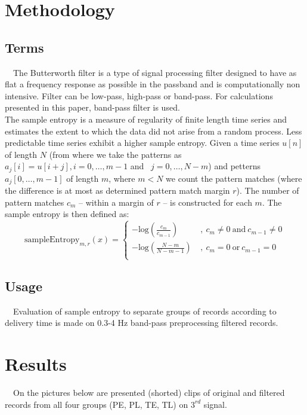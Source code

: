 \documentclass[a4paper,11pt]{article}
\begin{document}
\section{Methodology}

\subsection{Terms}
\ \
The Butterworth filter is a type of signal processing filter designed to have as flat a frequency response as possible in the passband and is computationally non intensive.
Filter can be low-pass, high-pass or band-pass. For calculations presented in this paper, band-pass filter is used.
\\
The sample entropy is a measure of regularity of finite length time series and estimates the extent to which the data did not arise from a random process.
Less predictable time series exhibit a higher sample entropy. 
Given a time series $u[n]$ of length $N$ (from where we take the patterns as $a_j[i] = u[i + j], i = 0, \ldots, m - 1$ and  $j = 0, \ldots, N - m$) and petterns $a_j[0, \ldots, m - 1]$ of length $m$, where $m < N$ we count the pattern matches (where the difference is at most as determined pattern match margin $r$).
The number of pattern matches $c_m$ -- within a margin of $r$ -- is constructed for each $m$.
The sample entropy is then defined as:
\begin{displaymath}
    \text{sampleEntropy}_{m, r}(x) = \left\{ \begin{array}{ll}
     - \text{log} \left( \frac{c_m}{c_{m-1}} \right) & \ , \ c_m \neq 0 \ \text{and} \ c_{m-1} \neq 0 \\
     - \text{log} \left( \frac{N - m}{N - m - 1} \right) & \ , \ c_m = 0 \ \text{or} \ c_{m-1} = 0 \\
    \end{array}  \right.
\end{displaymath}

\subsection{Usage}
\ \ 
Evaluation of sample entropy to separate groups of records according to delivery time is made on 0.3-4 Hz band-pass preprocessing filtered records.


\section{Results}
\ \ 
On the pictures below are presented (shorted) clips of original and filtered records from all four groups (PE, PL, TE, TL) on $3^{rd}$ signal.
\end{document}
